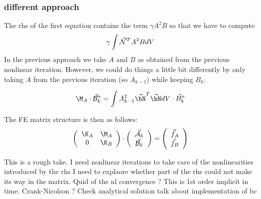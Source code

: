 \subsubsection*{different approach} The rhs of the first equation contains the term $\gamma A^2B$
so that we have to compute
\[
\gamma \int \vec{\cal N}^T A^2 B dV
\]
In the previous approach we take $A$ and $B$ as obtained from the previous nonlinear iteration. 
However, we could do things a little bit differently by only taking $A$ from the previous iteration (so $A_{k-1}$)
while keeping $B_{k}$.

\[
\M_A \cdot \vec{\cal B}^n_k =  \int A_{k-1}^2 \vec{\bN}^T \vec{\bN} dV  \cdot \vec{B}_k^n
\]


The FE matrix structure is then as follows:
\[
\left(
\begin{array}{cc}
\K_A & \M_A \\
0 & \K_B
\end{array}
\right)
\cdot
\left(
\begin{array}{c}
\vec{\cal A}_k\\
\vec{\cal B}_k
\end{array}
\right)
=
\left(
\begin{array}{c}
\vec{f}_A\\
\vec{f}_B
\end{array}
\right)
\]




\newpage

This is a rough take.
I need nonlinear iterations to take care of the nonlinearities introduced by the rhs
I need to explaore whether part of the rhs could not make its way in the matrix. 
Quid of the nl convergence ?
This is 1st order implicit in time. Crank-Nicolson ?
Check analytical solution 
talk about implementation of bc

